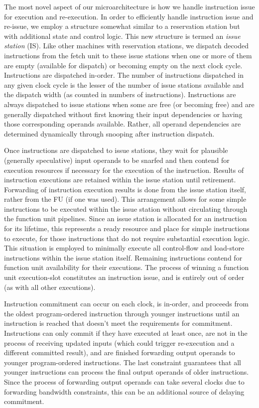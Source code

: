 \documentclass[10pt,twocolumn,dvips]{article}
\begin{document}
The most novel aspect of our microarchitecture is how we
handle instruction issue for execution and re-execution.
In order to efficiently handle instruction issue and re-issue,
we employ a structure somewhat similar to
a reservation station but with additional state and control
logic.  
This new structure is termed
an \textit{issue station} (IS).
Like other machines with reservation stations, we dispatch 
decoded instructions from the fetch unit to these issue stations
when one or more of them are empty (available for dispatch) or 
becoming empty on the next clock cycle.  
Instructions are dispatched in-order.
The number of instructions dispatched in any 
given clock cycle is
the lesser of the number of issue stations available and the
dispatch width (as counted in numbers of instructions).
Instructions are always dispatched to issue stations when
some are free (or becoming free) and are generally dispatched
without first knowing their input dependencies or having those
corresponding operands available.
Rather, all operand dependencies are determined dynamically through
snooping after instruction dispatch.

Once instructions are dispatched to issue stations,
they wait for plausible (generally speculative) input operands
to be snarfed and then
contend for execution resources if necessary for the execution
of the instruction.
Results of instruction executions are retained within
the issue station until retirement.  
Forwarding of instruction execution
results is done from the issue station itself, rather from the
FU (if one was used).
This arrangement allows for some simple instructions to be executed within
the issue station without circulating through the function unit
pipelines.  
Since an issue station is allocated for an instruction for
its lifetime, this represents a ready resource and place for simple
instructions to execute, for those instructions that do 
not require substantial execution logic.  
This situation is employed to minimally execute all
control-flow and load-store instructions within the
issue station itself.
Remaining instructions contend for 
function unit availability for their executions.
The process of winning a function unit execution-slot constitutes
an instruction issue, and is entirely out of order (as with
all other executions).

Instruction commitment can occur on each clock, is in-order, and
proceeds from the oldest program-ordered
instruction through younger instructions until an instruction
is reached that doesn't meet the requirements for commitment.
Instructions can only commit if they have executed at least once,
are not in the process of receiving updated inputs (which could
trigger re-execution and a different committed result),
and are finished forwarding output operands 
to younger program-ordered instructions.  
The last constraint guarantees that all younger
instructions can process the final output operands of older
instructions.
Since the process of forwarding output operands can take several
clocks due to forwarding bandwidth constraints, this can be
an additional source of delaying commitment.
\end{document}
